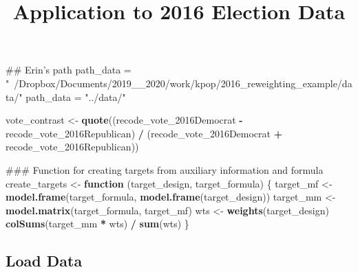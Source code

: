 \documentclass[]{article}
\title{Application to 2016 Election Data}
\author{}
\date{}
\newenvironment{Shaded}{\begin{snugshade}}{\end{snugshade}}
\newcommand{\ControlFlowTok}[1]{\textcolor[rgb]{0.13,0.29,0.53}{\textbf{#1}}}
\newcommand{\KeywordTok}[1]{\textcolor[rgb]{0.13,0.29,0.53}{\textbf{#1}}}
\newcommand{\NormalTok}[1]{#1}
\newcommand{\OperatorTok}[1]{\textcolor[rgb]{0.81,0.36,0.00}{\textbf{#1}}}
\newcommand{\StringTok}[1]{\textcolor[rgb]{0.31,0.60,0.02}{#1}}
\begin{document}
\maketitle

\begin{Shaded}
\begin{Highlighting}[]
\NormalTok{## Erin's path}
\NormalTok{path_data =}\StringTok{ "~/Dropbox/Documents/2019__2020/work/kpop/2016_reweighting_example/data/"}
\NormalTok{path_data =}\StringTok{ "../data/"}
\end{Highlighting}
\end{Shaded}

\begin{Shaded}
\begin{Highlighting}[]
\NormalTok{vote_contrast <-}\StringTok{ }\KeywordTok{quote}\NormalTok{((recode_vote_2016Democrat }\OperatorTok{-}\StringTok{ }\NormalTok{recode_vote_2016Republican) }\OperatorTok{/}
\StringTok{                           }\NormalTok{(recode_vote_2016Democrat }\OperatorTok{+}\StringTok{ }\NormalTok{recode_vote_2016Republican))}

\NormalTok{### Function for creating targets from auxiliary information and formula}
\NormalTok{create_targets <-}\StringTok{ }\ControlFlowTok{function}\NormalTok{ (target_design, target_formula) \{}
\NormalTok{    target_mf <-}\StringTok{ }\KeywordTok{model.frame}\NormalTok{(target_formula, }\KeywordTok{model.frame}\NormalTok{(target_design))}
\NormalTok{    target_mm <-}\StringTok{ }\KeywordTok{model.matrix}\NormalTok{(target_formula, target_mf)}
\NormalTok{    wts <-}\StringTok{ }\KeywordTok{weights}\NormalTok{(target_design)}
    \KeywordTok{colSums}\NormalTok{(target_mm }\OperatorTok{*}\StringTok{ }\NormalTok{wts) }\OperatorTok{/}\StringTok{ }\KeywordTok{sum}\NormalTok{(wts)}
\NormalTok{\}}
\end{Highlighting}
\end{Shaded}

\hypertarget{load-data}{%
\subsection{Load Data}\label{load-data}}
\end{document}
